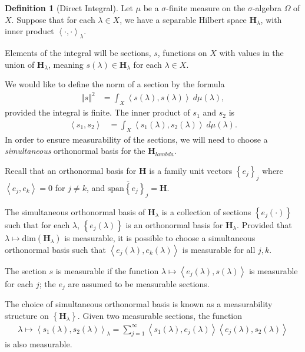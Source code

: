 \documentclass[10pt]{extarticle}
\newcommand{\set}[1]{\left\{#1\right\}}
\newcommand{\iprod}[2]{\left\langle #1,#2\right\rangle}
\newcommand{\norm}[1]{\left\Vert #1\right\Vert}
\theoremstyle{plain}
\theoremstyle{definition}
\newtheorem*{definition}{Definition}
\theoremstyle{remark}
\renewcommand{\newline}{\hfill\break}
\begin{document}
  \begin{definition}[Direct Integral]
    Let $\mu$ be a $\sigma$-finite measure on the $\sigma$-algebra $\Omega$ of $X$. Suppose that for each $\lambda \in X$, we have a separable Hilbert space $\mathbf{H}_{\lambda}$, with inner product $\iprod{\cdot}{\cdot}_{\lambda}$.\newline

    Elements of the integral will be sections, $s$, functions on $X$ with values in the union of $\mathbf{H}_{\lambda}$, meaning $s(\lambda)\in \mathbf{H}_{\lambda}$ for each $\lambda \in X$.\newline

    We would like to define the norm of a section by the formula
    \begin{align*}
      \norm{s}^{2} &= \int_{X}^{} \iprod{s(\lambda)}{s(\lambda)}\:d\mu(\lambda),
    \end{align*}
    provided the integral is finite. The inner product of $s_1$ and $s_2$ is
    \begin{align*}
      \iprod{s_1}{s_2} &= \int_{X}^{} \iprod{s_1(\lambda)}{s_2(\lambda)}\:d\mu(\lambda).
    \end{align*}
    In order to ensure measurability of the sections, we will need to choose a \textit{simultaneous} orthonormal basis for the $\mathbf{H}_{lambda}$.\newline

    Recall that an orthonormal basis for $\mathbf{H}$ is a family unit vectors $\set{e_j}_j$ where $\iprod{e_j}{e_k} = 0$ for $j\neq k$, and $\overline{\text{span}\set{e_j}_j} = \mathbf{H}$.\newline

    The simultaneous orthonormal basis of $\mathbf{H}_{\lambda}$ is a collection of sections $\set{e_j(\cdot)}$ such that for each $\lambda$, $\set{e_j(\lambda)}$ is an orthonormal basis for $\mathbf{H}_{\lambda}$. Provided that $\lambda \mapsto \text{dim}(\mathbf{H}_{\lambda})$ is measurable, it is possible to choose a simultaneous orthonormal basis such that $\iprod{e_j(\lambda)}{e_k(\lambda)}$ is measurable for all $j,k$.\newline

    The section $s$ is measurable if the function $\lambda \mapsto \iprod{e_j(\lambda)}{s(\lambda)}$ is measurable for each $j$; the $e_j$ are assumed to be measurable sections.\newline

    The choice of simultaneous orthonormal basis is known as a measurability structure on $\set{\mathbf{H}_{\lambda}}$. Given two measurable sections, the function
    \begin{align*}
      \lambda \mapsto \iprod{s_1(\lambda)}{s_2(\lambda)}_\lambda = \sum_{j=1}^{\infty}\iprod{s_1(\lambda)}{e_j(\lambda)}\iprod{e_j(\lambda)}{s_2(\lambda)}
    \end{align*}
    is also measurable.\newline


\end{definition}
\end{document}
